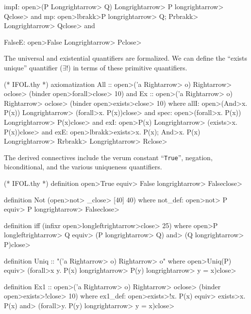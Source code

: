 \begin{node}[Formulas]
\begin{node}[Connectives]
\begin{Isabelle}
  impI: \<open>(P \<Longrightarrow> Q) \<Longrightarrow> P \<longrightarrow> Q\<close> and
  mp: \<open>\<lbrakk>P \<longrightarrow> Q; P\<rbrakk> \<Longrightarrow> Q\<close> and

  FalseE: \<open>False \<Longrightarrow> P\<close>
\end{Isabelle}
\end{node}

\begin{node}[Quantifiers]\label{isabelle:fol-0007}%
The universal and existential quantifiers are formalized. We can define
the ``exists unique'' quantifier ($\exists!$) in terms of these
primitive quantifiers.
\begin{Isabelle}
(* IFOL.thy *)
axiomatization
  All :: \<open>('a \<Rightarrow> o) \<Rightarrow> o\<close>  (binder \<open>\<forall>\<close> 10) and
  Ex :: \<open>('a \<Rightarrow> o) \<Rightarrow> o\<close>  (binder \<open>\<exists>\<close> 10)
where
  allI: \<open>(\<And>x. P(x)) \<Longrightarrow> (\<forall>x. P(x))\<close> and
  spec: \<open>(\<forall>x. P(x)) \<Longrightarrow> P(x)\<close> and
  exI: \<open>P(x) \<Longrightarrow> (\<exists>x. P(x))\<close> and
  exE: \<open>\<lbrakk>\<exists>x. P(x); \<And>x. P(x) \<Longrightarrow> R\<rbrakk> \<Longrightarrow> R\<close>
\end{Isabelle}
\end{node}

\begin{node}\label{isabelle:fol-0008}%
The derived connectives include the verum constant ``\texttt{True}'',
negation, biconditional, and the various uniqueness quantifiers.
\begin{Isabelle}
(* IFOL.thy *)
definition \<open>True \<equiv> False \<longrightarrow> False\<close>

definition Not (\<open>\<not> _\<close> [40] 40)
  where not_def: \<open>\<not> P \<equiv> P \<longrightarrow> False\<close>

definition iff  (infixr \<open>\<longleftrightarrow>\<close> 25)
  where \<open>P \<longleftrightarrow> Q \<equiv> (P \<longrightarrow> Q) \<and> (Q \<longrightarrow> P)\<close>

definition Uniq :: "('a \<Rightarrow> o) \<Rightarrow> o"
  where \<open>Uniq(P) \<equiv> (\<forall>x y. P(x) \<longrightarrow> P(y) \<longrightarrow> y = x)\<close>

definition Ex1 :: \<open>('a \<Rightarrow> o) \<Rightarrow> o\<close>  (binder \<open>\<exists>!\<close> 10)
  where ex1_def: \<open>\<exists>!x. P(x) \<equiv> \<exists>x. P(x) \<and> (\<forall>y. P(y) \<longrightarrow> y = x)\<close>
\end{Isabelle}
\end{node}


\end{node}
